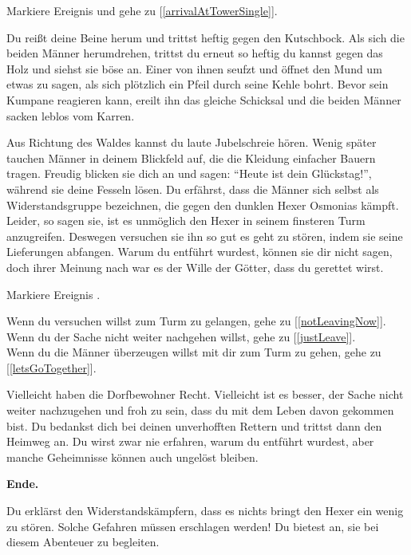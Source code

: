 Markiere Ereignis  und gehe zu [\ref{arrivalAtTowerSingle}].


Du reißt deine Beine herum und trittst heftig gegen den Kutschbock. Als sich die beiden Männer herumdrehen, trittst du erneut so heftig du kannst gegen das Holz und siehst sie böse an. Einer von ihnen seufzt und öffnet den Mund um etwas zu sagen, als sich plötzlich ein Pfeil durch seine Kehle bohrt. Bevor sein Kumpane reagieren kann, ereilt ihn das gleiche Schicksal und die beiden Männer sacken leblos vom Karren.

Aus Richtung des Waldes kannst du laute Jubelschreie hören. Wenig später tauchen Männer in deinem Blickfeld auf, die die Kleidung einfacher Bauern tragen. Freudig blicken sie dich an und sagen: ``Heute ist dein Glückstag!'', während sie deine Fesseln lösen. Du erfährst, dass die Männer sich selbst als Widerstandsgruppe bezeichnen, die gegen den dunklen Hexer Osmonias kämpft. Leider, so sagen sie, ist es unmöglich den Hexer in seinem finsteren Turm anzugreifen. Deswegen versuchen sie ihn so gut es geht zu stören, indem sie seine Lieferungen abfangen. Warum du entführt wurdest, können sie dir nicht sagen, doch ihrer Meinung nach war es der Wille der Götter, dass du gerettet wirst.

Markiere Ereignis .

Wenn du versuchen willst zum Turm zu gelangen, gehe zu [\ref{notLeavingNow}].
\\Wenn du der Sache nicht weiter nachgehen willst, gehe zu [\ref{justLeave}].
\\Wenn du die Männer überzeugen willst mit dir zum Turm zu gehen, gehe zu [\ref{letsGoTogether}].


Vielleicht haben die Dorfbewohner Recht. Vielleicht ist es besser, der Sache nicht weiter nachzugehen und froh zu sein, dass du mit dem Leben davon gekommen bist. Du bedankst dich bei deinen unverhofften Rettern und trittst dann den Heimweg an. Du wirst zwar nie erfahren, warum du entführt wurdest, aber manche Geheimnisse können auch ungelöst bleiben.

\textbf{Ende.}


Du erklärst den Widerstandskämpfern, dass es nichts bringt den Hexer ein wenig zu stören. Solche Gefahren müssen erschlagen werden! Du bietest an, sie bei diesem Abenteuer zu begleiten.

